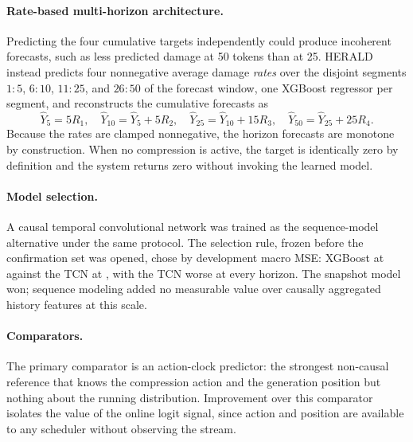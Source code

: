 \paragraph{Rate-based multi-horizon architecture.}
Predicting the four cumulative targets independently could produce
incoherent forecasts, such as less predicted damage at 50 tokens than at 25.
HERALD instead predicts four nonnegative average damage \emph{rates} over the
disjoint segments $1{:}5$, $6{:}10$, $11{:}25$, and $26{:}50$ of the forecast
window, one XGBoost regressor per segment, and reconstructs the cumulative
forecasts as
\begin{equation}
\hat Y_5 = 5R_1, \quad
\hat Y_{10} = \hat Y_5 + 5R_2, \quad
\hat Y_{25} = \hat Y_{10} + 15R_3, \quad
\hat Y_{50} = \hat Y_{25} + 25R_4.
\label{eq:rates}
\end{equation}
Because the rates are clamped nonnegative, the horizon forecasts are monotone
by construction. When no compression is active, the target is identically
zero by definition and the system returns zero without invoking the learned
model.

\paragraph{Model selection.}
A causal temporal convolutional network was trained as the sequence-model
alternative under the same protocol. The selection rule, frozen before the
confirmation set was opened, chose by development macro MSE: XGBoost at
 against the TCN at
, with the TCN worse at every horizon. The snapshot model won;
sequence modeling added no measurable value over causally aggregated history
features at this scale.

\paragraph{Comparators.}
The primary comparator is an action-clock predictor: the strongest
non-causal reference that knows the compression action and the generation
position but nothing about the running distribution.
 Improvement over
this comparator isolates the value of the online logit signal, since action
and position are available to any scheduler without observing the stream.
